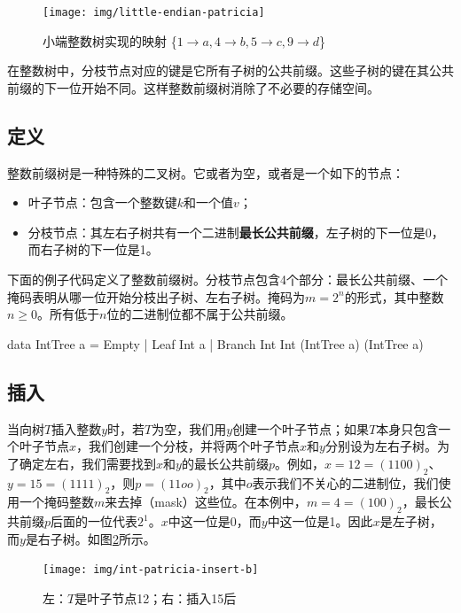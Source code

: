 \documentclass[b5paper]{ctexart}
\begin{document}
\begin{figure}[htbp]
  \centering
  \texttt{[image: img/little-endian-patricia]}
  \caption{小端整数树实现的映射
     \{$ 1 \rightarrow a, 4 \rightarrow b, 5 \rightarrow c, 9 \rightarrow d$\}}
  \label{fig:little-endian-patricia}
\end{figure}

在整数树中，分枝节点对应的键是它所有子树的公共前缀。这些子树的键在其公共前缀的下一位开始不同。这样整数前缀树消除了不必要的存储空间。

\subsection{定义}

整数前缀树是一种特殊的二叉树。它或者为空，或者是一个如下的节点：

\begin{itemize}
\item 叶子节点：包含一个整数键$k$和一个值$v$；
\item 分枝节点：其左右子树共有一个二进制\textbf{最长公共前缀}，左子树的下一位是0，而右子树的下一位是1。
\end{itemize}

下面的例子代码定义了整数前缀树。分枝节点包含4个部分：最长公共前缀、一个掩码表明从哪一位开始分枝出子树、左右子树。掩码为$m = 2^n$的形式，其中整数$n \geq 0$。所有低于$n$位的二进制位都不属于公共前缀。

\begin{Haskell}
data IntTree a = Empty
               | Leaf Int a
               | Branch Int Int (IntTree a) (IntTree a)
\end{Haskell}

\subsection{插入}
当向树$T$插入整数$y$时，若$T$为空，我们用$y$创建一个叶子节点；如果$T$本身只包含一个叶子节点$x$，我们创建一个分枝，并将两个叶子节点$x$和$y$分别设为左右子树。为了确定左右，我们需要找到$x$和$y$的最长公共前缀$p$。例如，$x = 12 = (1100)_2$、$y = 15 = (1111)_2$，则$p = (11oo)_2$，其中$o$表示我们不关心的二进制位，我们使用一个掩码整数$m$来去掉（mask）这些位。在本例中，$m = 4 = (100)_2$，最长公共前缀$p$后面的一位代表$2^1$。$x$中这一位是0，而$y$中这一位是1。因此$x$是左子树，而$y$是右子树。如图\ref{fig:int-patricia-insert-b}所示。

\begin{figure}[htbp]
  \centering
  \texttt{[image: img/int-patricia-insert-b]}
  \caption{左：$T$是叶子节点12；右：插入15后}
  \label{fig:int-patricia-insert-b}
\end{figure}
\end{document}
